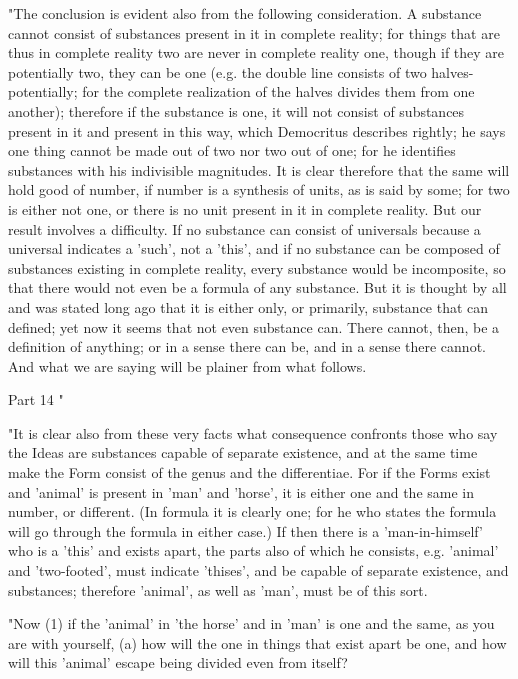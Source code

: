 "The conclusion is evident also from the following consideration.
A substance cannot consist of substances present in it in complete
reality; for things that are thus in complete reality two are never
in complete reality one, though if they are potentially two, they
can be one (e.g. the double line consists of two halves-potentially;
for the complete realization of the halves divides them from one another);
therefore if the substance is one, it will not consist of substances
present in it and present in this way, which Democritus describes
rightly; he says one thing cannot be made out of two nor two out of
one; for he identifies substances with his indivisible magnitudes.
It is clear therefore that the same will hold good of number, if number
is a synthesis of units, as is said by some; for two is either not
one, or there is no unit present in it in complete reality. But our
result involves a difficulty. If no substance can consist of universals
because a universal indicates a 'such', not a 'this', and if no substance
can be composed of substances existing in complete reality, every
substance would be incomposite, so that there would not even be a
formula of any substance. But it is thought by all and was stated
long ago that it is either only, or primarily, substance that can
defined; yet now it seems that not even substance can. There cannot,
then, be a definition of anything; or in a sense there can be, and
in a sense there cannot. And what we are saying will be plainer from
what follows. 

Part 14 "

"It is clear also from these very facts what consequence confronts
those who say the Ideas are substances capable of separate existence,
and at the same time make the Form consist of the genus and the differentiae.
For if the Forms exist and 'animal' is present in 'man' and 'horse',
it is either one and the same in number, or different. (In formula
it is clearly one; for he who states the formula will go through the
formula in either case.) If then there is a 'man-in-himself' who is
a 'this' and exists apart, the parts also of which he consists, e.g.
'animal' and 'two-footed', must indicate 'thises', and be capable
of separate existence, and substances; therefore 'animal', as well
as 'man', must be of this sort. 

"Now (1) if the 'animal' in 'the horse' and in 'man' is one and the
same, as you are with yourself, (a) how will the one in things that
exist apart be one, and how will this 'animal' escape being divided
even from itself? 

